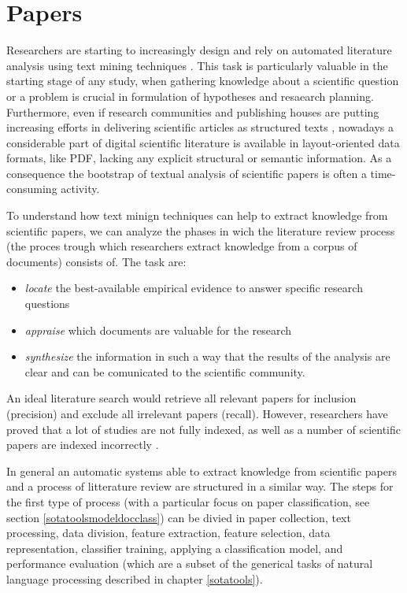 \documentclass[]{book}
\providecommand{\tightlist}{%
  \setlength{\itemsep}{0pt}\setlength{\parskip}{0pt}}
\begin{document}
\section{Papers}\label{sotadocumentspapers}

Researchers are starting to increasingly design and rely on automated
literature analysis using text mining techniques \citep{nuzzo2010text}.
This task is particularly valuable in the starting stage of any study,
when gathering knowledge about a scientific question or a problem is
crucial in formulation of hypotheses and resaearch planning.
Furthermore, even if research communities and publishing houses are
putting increasing efforts in delivering scientific articles as
structured texts \citep{poelmans2012text}, nowadays a considerable part
of digital scientific literature is available in layout-oriented data
formats, like PDF, lacking any explicit structural or semantic
information. As a consequence the bootstrap of textual analysis of
scientific papers is often a time-consuming activity.

To understand how text minign techniques can help to extract knowledge
from scientific papers, we can analyze the phases in wich the literature
review process (the proces trough which researchers extract knowledge
from a corpus of documents) consists of. The task are:

\begin{itemize}
\tightlist
\item
  \emph{locate} the best-available empirical evidence to answer specific
  research questions
\item
  \emph{appraise} which documents are valuable for the research
\item
  \emph{synthesize} the information in such a way that the results of
  the analysis are clear and can be comunicated to the scientific
  community.
\end{itemize}

An ideal literature search would retrieve all relevant papers for
inclusion (precision) and exclude all irrelevant papers (recall).
However, researchers have proved that a lot of studies are not fully
indexed, as well as a number of scientific papers are indexed
incorrectly
\citep{cooper1988structure, okoli2010guide15, edinger2013large}.

In general an automatic systems able to extract knowledge from
scientific papers and a process of litterature review are structured in
a similar way. The steps for the first type of process (with a
particular focus on paper classification, see section
\ref{sotatoolsmodeldocclass}) can be divied in paper collection, text
processing, data division, feature extraction, feature selection, data
representation, classifier training, applying a classification model,
and performance evaluation
\citep{khorsheed2013comparative, weiss2010text, carlos2015text} (which
are a subset of the generical tasks of natural language processing
described in chapter \ref{sotatools}).
\end{document}
